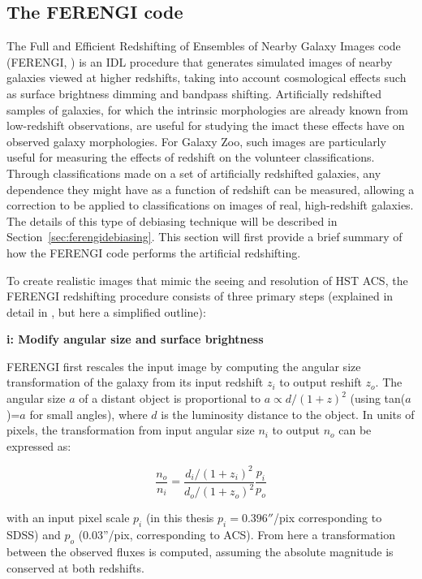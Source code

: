 \subsection{The FERENGI code}
\label{sec:ferengicode}
The Full and Efficient Redshifting of Ensembles of Nearby Galaxy Images code (FERENGI, \citet{Barden2008}) is an IDL procedure that generates simulated images of nearby galaxies viewed at higher redshifts, taking into account cosmological effects such as surface brightness dimming and bandpass shifting. Artificially redshifted samples of galaxies, for which the intrinsic morphologies are already known from low-redshift observations, are useful for studying the imact these effects have on observed galaxy morphologies. For Galaxy Zoo, such images are particularly useful for measuring the effects of redshift on the volunteer classifications. Through classifications made on a set of artificially redshifted galaxies, any dependence they might have as a function of redshift can be measured, allowing a correction to be applied to classifications on images of real, high-redshift galaxies. The details of this type of debiasing technique will be described in Section~\ref{sec:ferengidebiasing}. This section will first provide a brief summary of how the FERENGI code performs the artificial redshifting.

To create realistic images that mimic the seeing and resolution of HST ACS, the FERENGI redshifting procedure consists of three primary steps (explained in detail in \citet{Barden2008}, but here a simplified outline):

\textbf{i: Modify angular size and surface brightness}

FERENGI first rescales the input image by computing the angular size transformation of the galaxy from its input redshift $z_{i}$ to output reshift $z_{o}$. The angular size $a$ of a distant object is proportional to $a \propto d/(1+z)^2$ (using tan($a$)=$a$ for small angles), where $d$ is the luminosity distance to the object. In units of pixels, the transformation from input angular size $n_{i}$ to output $n_{o}$ can be expressed as:

\begin{equation}
\frac{n_{o}}{n_{i}}= \frac{d_{i}/(1+z_{i})^2}{d_{o}/(1+z_{o})^2} \frac{p_{i}}{p_{o}} 
\label{eqn:ferengi_rebinning}
\end{equation}

with an input pixel scale $p_{i}$ (in this thesis $p_{i}=0.396''$/pix corresponding to SDSS) and $p_{o}$ (0.03''/pix, corresponding to ACS). From here a transformation between the observed fluxes is computed, assuming the absolute magnitude is conserved at both redshifts. 

